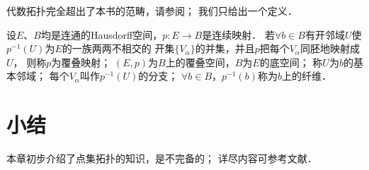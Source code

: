 









代数拓扑完全超出了本书的范畴，请参阅\parencite{munkres-2000-topology}；
我们只给出一个定义．

\begin{definition}\label{chtop:def_covering-map}
    设$E$、$B$均是连通的Hausdorff空间，$p:E\to B$是连续映射．
    若$\forall b\in B$有开邻域$U$使$p^{-1}(U)$为$E$的一族两两不相交的
    开集$\{V_\alpha\}$的并集，并且$p$把每个$V_\alpha$同胚地映射成$U$，
    则称$p$为{\heiti 覆叠映射}；
    $(E,p)$为$B$上的{\heiti 覆叠空间}，$B$为$E$的{\heiti 底空间}；
    称$U$为$b$的{\heiti 基本邻域}；
    每个$V_\alpha$叫作$p^{-1}(U)$的{\heiti 分支}；
    $\forall b\in B$，$p^{-1}(b)$称为$b$上的{\heiti 纤维}．
     
\end{definition}








\section*{小结}
本章初步介绍了点集拓扑的知识，是不完备的；
详尽内容可参考文献\parencite{munkres-2000-topology}．




\endinput


%
%
